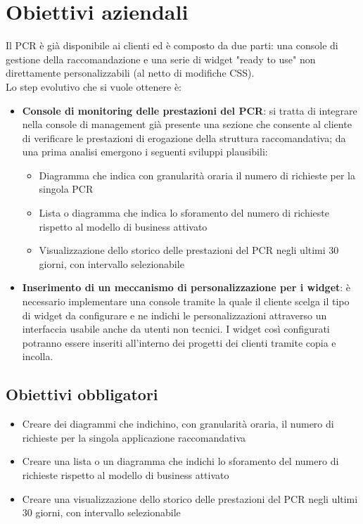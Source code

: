 \documentclass[a4paper, 12pt, twoside, openright]{book}
\begin{document}
\section{Obiettivi aziendali}
Il PCR è già disponibile ai clienti ed è composto da due parti: una console di gestione della raccomandazione e una serie di widget "ready to use" non direttamente personalizzabili (al netto di modifiche CSS).\\
Lo step evolutivo che si vuole ottenere è:
\begin{itemize}
\item \textbf{Console di monitoring delle prestazioni del PCR}: si tratta di integrare nella console di management già presente una sezione che consente al cliente di verificare le prestazioni di erogazione della struttura raccomandativa; da una prima analisi emergono i seguenti sviluppi plausibili:
	\begin{itemize}
	\item Diagramma che indica con granularità oraria il numero di richieste per la singola PCR
	\item Lista o diagramma che indica lo sforamento del numero di richieste rispetto al modello di business attivato
	\item Visualizzazione dello storico delle prestazioni del PCR negli ultimi 30 giorni, con intervallo selezionabile
	\end{itemize}
\item \textbf{Inserimento di un meccanismo di personalizzazione per i widget}: è necessario implementare una console tramite la quale il cliente scelga il tipo di widget da configurare e ne indichi le personalizzazioni attraverso un interfaccia usabile anche da utenti non tecnici. I widget così configurati potranno essere inseriti all'interno dei progetti dei clienti tramite copia e incolla.
\end{itemize}

\subsection{Obiettivi obbligatori}
\begin{itemize}
\item Creare dei diagrammi che indichino, con granularità oraria, il numero di richieste per la singola applicazione raccomandativa
\item Creare una lista o un diagramma che indichi lo sforamento del numero di richieste rispetto al modello di business attivato
\item Creare una visualizzazione dello storico delle prestazioni del PCR negli ultimi 30 giorni, con intervallo selezionabile
\end{itemize}
\end{document}
